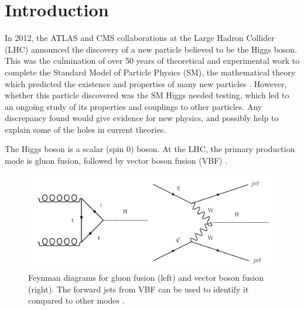\documentclass[12pt]{article}
\begin{document}
\begin{abstract}
((2421 words))
The simplified template cross section method for collecting data about the Higgs is considered as a potential target for machine learning methods, for identification and classification of events from the diphoton decay. This combination is designed to be applied to upcoming LHC data, to measure the properties of the Higgs more accurately and look for deviation from the Standard Model. New machine learning techniques such as deep learning are analysed as a potential upgrade to the methods being used currently. 

\end{abstract}

\section*{Introduction}
In 2012, the ATLAS \cite{atlasann} and CMS \cite{cmsannouncement} collaborations at the Large Hadron Collider (LHC) announced the discovery of a new particle believed to be the Higgs boson. This was the culmination of over 50 years of theoretical and experimental work to complete the Standard Model of Particle Physics (SM), the mathematical theory which predicted the existence and properties of many new particles \cite{smpredictions}. However, whether this particle discovered was the SM Higgs needed testing, which led to an ongoing study of its properties and couplings to other particles. Any discrepancy found would give evidence for new physics, and possibly help to explain some of the holes in current theories.

The Higgs boson is a scalar (spin 0) boson. At the LHC, the primary production mode is gluon fusion, followed by vector boson fusion (VBF) \cite{higgsproduction}. 

\begin{figure}[H]
\centering
\includegraphics[width=12cm]{form.png}
\caption{Feynman diagrams for gluon fusion (left) and vector boson fusion (right). The forward jets from VBF can be used to identify it compared to other modes \cite{feynmanmaker}.}
	\label{form}
\end{figure}
\end{document}
